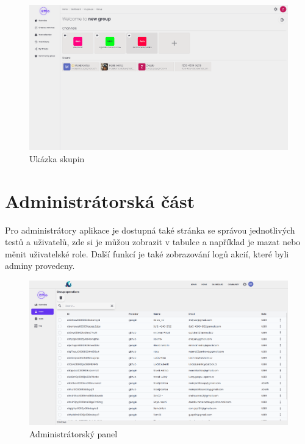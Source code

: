 \documentclass[12pt, a4paper,
openright
]{report}
\begin{document}
\begin{figure}[H]
	\centering %
	\includegraphics[width=1\linewidth]{image/groups.png} 
	\caption{Ukázka skupin} %
	\label{fig:groups} %
\end{figure}

\section{Administrátorská část}
Pro administrátory aplikace je dostupná také stránka se správou jednotlivých testů a uživatelů, zde si je můžou zobrazit v tabulce a například je mazat nebo měnit uživatelské role. Další funkcí je také zobrazování logů akcií, které byli adminy provedeny.

\begin{figure}[H]
	\centering %
	\includegraphics[width=1\linewidth]{image/admin.png} 
	\caption{Administrátorský panel} %
	\label{fig:admin} %
\end{figure}
\end{document}
